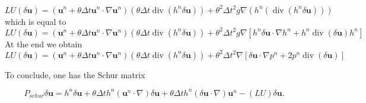 \documentclass[a4paper, 11pt]{article}
\begin{document}
\begin{equation*}
LU(\delta \boldsymbol{u})=\left(\boldsymbol{u}^n+\theta \Delta t \boldsymbol{u}^n\cdot \nabla \boldsymbol{u}^n \right)\left(\theta \Delta t \operatorname{div}(h^n \delta \boldsymbol{u})\right)
+\theta^2 \Delta t^2 g\nabla\left( h^n\left(\operatorname{div}(h^n\delta  \boldsymbol{u})\right)\right)\end{equation*}
which is equal to
\begin{equation*}
LU(\delta \boldsymbol{u})=\left(\boldsymbol{u}^n+\theta \Delta t \boldsymbol{u}^n\cdot \nabla \boldsymbol{u}^n \right)\left(\theta \Delta t \operatorname{div}(h^n \delta \boldsymbol{u})\right)
+\theta^2 \Delta t^2 g\nabla\left[ h^n \delta \boldsymbol{u}\cdot \nabla h^n + h^n \operatorname{div}(\delta \boldsymbol{u})h^n \right]\end{equation*}
At the end we obtain
\begin{equation*}
LU(\delta \boldsymbol{u})=\left(\boldsymbol{u}^n+\theta \Delta t \boldsymbol{u}^n\cdot \nabla \boldsymbol{u}^n \right)\left(\theta \Delta t \operatorname{div}(h^n \delta \boldsymbol{u})\right)
+\theta^2 \Delta t^2 \nabla\left[ \delta \boldsymbol{u}\cdot \nabla p^n + 2p^n \operatorname{div}(\delta \boldsymbol{u}) \right]
\end{equation*}

To conclude, one has the Schur matrix 
\begin{small}
\begin{equation*}
P_{schur}\delta \boldsymbol{u}=h^n \delta \boldsymbol{u}+\theta\Delta th^n\left(\boldsymbol{u}^n\cdot\nabla\right)\delta \boldsymbol{u}+\theta\Delta th^n\left(\delta \boldsymbol{u} \cdot\nabla\right)\boldsymbol{u}^n-(LU)\delta \boldsymbol{u}.
\end{equation*}
\end{small}
\end{document}
